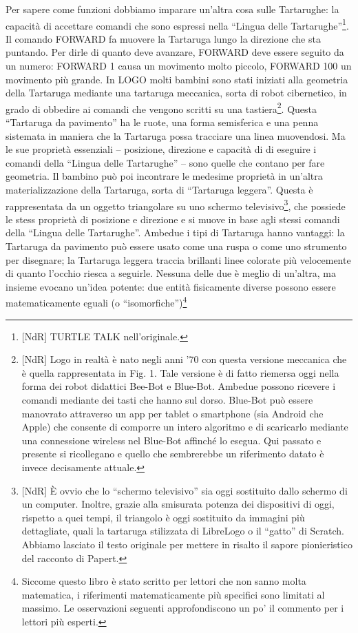 Per sapere come funzioni dobbiamo imparare un'altra cosa sulle Tartarughe: la capacità di accettare comandi che sono espressi nella “Lingua delle Tartarughe”\footnote{[NdR] TURTLE TALK nell'originale.}. Il comando FORWARD fa muovere la Tartaruga lungo la direzione che sta puntando. Per dirle di quanto deve avanzare, FORWARD deve essere seguito da un numero: FORWARD 1 causa un movimento molto piccolo, FORWARD 100 un movimento più grande. In LOGO molti bambini sono stati iniziati alla geometria della Tartaruga mediante una tartaruga meccanica, sorta di robot cibernetico, in grado di obbedire ai comandi che vengono scritti su una tastiera\footnote{[NdR] Logo in realtà è nato negli anni '70 con questa versione meccanica che è quella rappresentata in Fig. 1. Tale versione è di fatto riemersa oggi nella forma dei robot didattici Bee-Bot e Blue-Bot. Ambedue possono ricevere i comandi mediante dei tasti che hanno sul dorso. Blue-Bot può essere manovrato attraverso un app per tablet o smartphone (sia Android che Apple) che consente di comporre un intero algoritmo e di scaricarlo mediante una connessione wireless nel Blue-Bot affinché lo esegua. Qui passato e presente si ricollegano e quello che sembrerebbe un riferimento datato è invece decisamente attuale.}. Questa “Tartaruga da pavimento” ha le ruote, una forma semisferica e una penna sistemata in maniera che la Tartaruga possa tracciare una linea muovendosi. Ma le sue proprietà essenziali – posizione, direzione e capacità di di eseguire i comandi della “Lingua delle Tartarughe” – sono quelle che contano per fare geometria. Il bambino può poi incontrare le medesime proprietà in un'altra materializzazione della Tartaruga, sorta di “Tartaruga leggera”. Questa è rappresentata da un oggetto triangolare su uno schermo televisivo\footnote{[NdR] È ovvio che lo “schermo televisivo” sia oggi sostituito dallo schermo di un computer. Inoltre, grazie alla smisurata potenza dei dispositivi di oggi, rispetto a quei tempi, il triangolo è oggi sostituito da immagini più dettagliate, quali la tartaruga stilizzata di LibreLogo o il “gatto” di Scratch. Abbiamo lasciato il testo originale per mettere in risalto il sapore pionieristico del racconto di Papert.  }, che possiede le stess proprietà di posizione e direzione e si muove in base agli stessi comandi della “Lingua delle Tartarughe”. Ambedue i tipi di Tartaruga hanno vantaggi: la Tartaruga da pavimento può essere usato come una ruspa o come uno strumento per disegnare; la Tartaruga leggera traccia brillanti linee colorate più velocemente di quanto l'occhio riesca a seguirle. Nessuna delle due è meglio di un'altra, ma insieme evocano un'idea potente: due entità fisicamente diverse possono essere matematicamente eguali (o “isomorfiche”)\footnote{Siccome questo libro è stato scritto per lettori che non sanno molta matematica, i riferimenti matematicamente più specifici sono limitati al massimo. Le osservazioni seguenti approfondiscono un po' il commento per i lettori più esperti.
}
